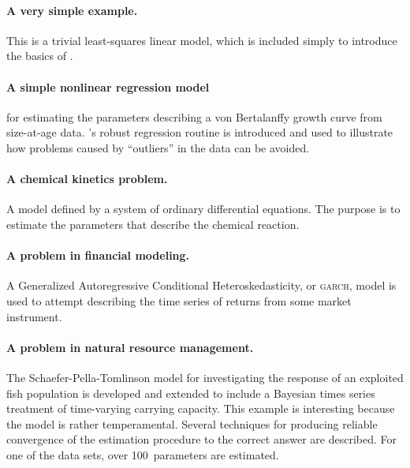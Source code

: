 \documentclass{admbmanual}
\begin{document}

\paragraph{A very simple example.} This is a trivial least-squares linear model,
which is included simply to introduce the basics of \ADM.

\paragraph{A simple nonlinear regression model} for estimating the parameters
describing a von Bertalanffy growth curve from size-at-age data. \ADM's robust
regression routine is introduced and used to illustrate how problems caused by
``outliers'' in the data can be avoided.

\paragraph{A chemical kinetics problem.} A model defined by a system of ordinary
differential equations. The purpose is to estimate the parameters that describe
the chemical reaction.

\paragraph{A problem in financial modeling.} A Generalized Autoregressive
Conditional Hetero\-ske\-dast\-icity, or \textsc{garch}, model is used to
attempt describing the time series of returns from some market instrument.

\paragraph{A problem in natural resource management.} The
Schaefer-Pella-Tomlinson model for investigating the response of an exploited
fish population is developed and extended to include a Bayesian times series
treatment of time-varying carrying capacity. This example is interesting because
the model is rather temperamental. Several techniques for producing reliable
convergence of the estimation procedure to the correct answer are described. For
one of the data sets, over 100~parameters are estimated.
\end{document}
